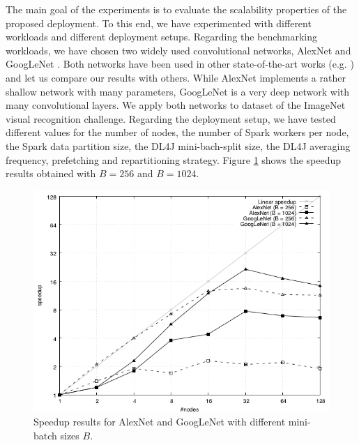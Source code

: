 \documentclass[journal]{IEEEtran}
\begin{document}
The main goal of the experiments is to evaluate the scalability properties of the proposed deployment. To this end, we have experimented with different workloads and different deployment setups. Regarding the benchmarking workloads, we have chosen two widely used convolutional networks, AlexNet \cite{DBLP:journals/cacm/KrizhevskySH17} and GoogLeNet \cite{DBLP:conf/cvpr/SzegedyLJSRAEVR15}. Both networks have been used in other state-of-the-art works (e.g. \cite{DBLP:conf/sc/KeuperP16}) and let us compare our results with others. While AlexNet implements a rather shallow network with many parameters, GoogLeNet is a very deep network with many convolutional layers. We apply both networks to dataset of the ImageNet \cite{DBLP:journals/ijcv/RussakovskyDSKS15} visual recognition challenge. Regarding the deployment setup, we have tested different values for the number of nodes, the number of Spark workers per node, the Spark data partition size, the DL4J mini-bach-split size, the DL4J averaging frequency, prefetching and repartitioning strategy. Figure \ref{fig:speedup1} shows the speedup results obtained with $B = 256$ and $B = 1024$.    
\begin{figure}
\begin{center}
\centerline{\includegraphics[width=1.0\linewidth]{plots/results.png}}
\caption{Speedup results for AlexNet \cite{DBLP:journals/cacm/KrizhevskySH17} and GoogLeNet \cite{DBLP:conf/cvpr/SzegedyLJSRAEVR15} with different mini-batch sizes $B$.}
\label{fig:speedup1}
\end{center}
\vspace{-0.5cm}
\end{figure}
\end{document}
